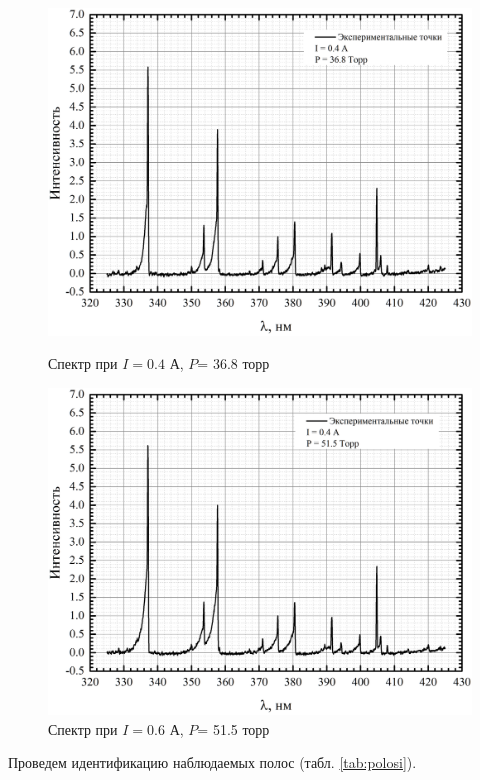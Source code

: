 \begin{figure}[H]
\begin{minipage}{0.45\linewidth}
		\centering
		\includegraphics[width=\linewidth]{full_04_368}
		\caption{Спектр при $I= 0.4 $ А, $P$= 36.8 торр}	
		\label{full_04_368}
	\end{minipage} 
	\hfill
	\begin{minipage}[H]{0.45\linewidth}
		\centering
		\includegraphics[width=\linewidth]{full_04_515}
		\caption{Спектр при $I= 0.6 $ А, $P$= 51.5 торр}
		\label{full_04_515}
	\end{minipage}
\end{figure}

Проведем идентификацию наблюдаемых полос (табл. \ref{tab:polosi}).

